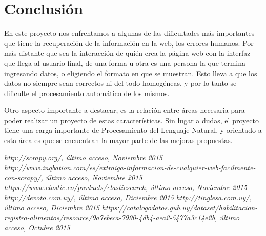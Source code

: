\documentclass[12pt]{article} %
\begin{document}

\section{Conclusión}

En este proyecto nos enfrentamos a algunas de las dificultades más importantes que tiene la recuperación de la información en la web, los errores humanos. Por más distante que sea la interacción de quién crea la página web con la interfaz que llega al usuario final, de una forma u otra es una persona la que termina ingresando datos, o eligiendo el formato en que se muestran. Esto lleva a que los datos no siempre sean correctos ni del todo homogéneas, y por lo tanto se dificulte el procesamiento automático de los mismos.

Otro aspecto importante a destacar, es la relación entre áreas necesaria para poder realizar un proyecto de estas características. Sin lugar a dudas, el proyecto tiene una carga importante de Procesamiento del Lenguaje Natural, y orientado a esta área es que se encuentran la mayor parte de las mejoras propuestas.



\newpage

\begin{thebibliography}{1}
 \textit{http://scrapy.org/, último acceso, Noviembre 2015}
 \textit{http://www.inqbation.com/es/extraiga-informacion-de-cualquier-web-facilmente-con-scrapy/, último acceso, Noviembre 2015}
 \textit{https://www.elastic.co/products/elasticsearch, último acceso, Noviembre 2015}
 \textit{http://devoto.com.uy/, último acceso, Diciembre 2015}
 \textit{http://tinglesa.com.uy/, último acceso, Diciembre 2015}
 \textit{https://catalogodatos.gub.uy/dataset/habilitacion-registro-alimentos/resource/9a7ebeca-7990-4db4-aea2-5477a3c14e2b, último acceso, Octubre 2015}

\end{thebibliography}

\end{document}
